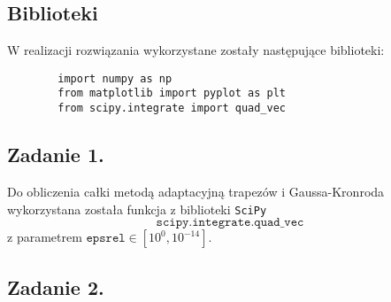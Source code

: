 \documentclass[11pt]{scrartcl}
\begin{document}
    \subsection{Biblioteki}
    W realizacji rozwiązania wykorzystane zostały następujące
    biblioteki:
    \begin{lstlisting}
        import numpy as np
        from matplotlib import pyplot as plt
        from scipy.integrate import quad_vec
    \end{lstlisting}

    \subsection{Zadanie 1.}
    Do obliczenia całki metodą adaptacyjną trapezów
    i Gaussa-Kronroda wykorzystana została funkcja
    z biblioteki \texttt{SciPy}
    \[
        \texttt{scipy.integrate.quad\_vec}
    \]
    z parametrem $\texttt{epsrel} \in [10^0,10^{-14}]$.

    \subsection{Zadanie 2.}
\end{document}
